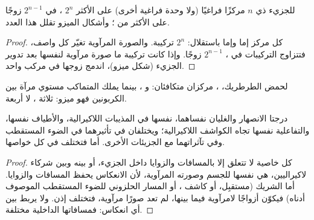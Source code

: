 \begin{proposition}\label{prop:b1:stereochemistry-in-depth:max-stereoisomers}
للجزيء ذي $n$ مركزًا فراغيًا (ولا وحدة فراغية أخرى) على الأكثر
$2^n$ ، في $2^{n-1}$ زوجًا على الأكثر من
؛ وأشكال الميزو تقلل هذا العدد.
\end{proposition}

\begin{proof}
كل مركز إما  وإما  باستقلال: $2^n$ تركيبة.
والصورة المرآوية تغيّر كل واصف، فتتزاوج التركيبات في
، $2^{n-1}$ زوجًا. وإذا كانت تركيبة ما صورة مرآوية لنفسها
بعد تدوير الجزيء (شكل ميزو)، اندمج زوجها في
مركب واحد.
\end{proof}

لحمض الطرطريك، ، مركزان متكافئان:
 و ، بينما يملك المتماكب  مستوي مرآة
بين الكربونين فهو ميزو: ثلاثة ، لا أربعة.

\begin{proposition}\label{prop:b1:stereochemistry-in-depth:enantiomer-properties}
 درجتا الانصهار والغليان نفساهما،  نفسها
في المذيبات اللاكيرالية، والأطياف نفسها، والتفاعلية نفسها تجاه الكواشف اللاكيرالية؛
ويختلفان في تأثيرهما في الضوء المستقطب وفي تآثراتهما
مع الجزيئات  الأخرى. أما  فتختلف في كل
خواصها.
\end{proposition}

\begin{proof}
كل خاصية لا تتعلق إلا بالمسافات والزوايا داخل
الجزيء، أو بينه وبين شركاء لاكيراليين، هي نفسها للجسم
وصورته المرآوية، لأن الانعكاس يحفظ المسافات
والزوايا. أما الشريك  (مستقبِل، أو كاشف ، أو المسار الحلزوني
للضوء المستقطب الموصوف أدناه) فيكوّن أزواجًا لامرآوية فيما بينها،
لم تعد صورًا مرآوية، فتختلف إذن. ولا يربط بين 
أي انعكاس: فمسافاتها الداخلية مختلفة.
\end{proof}

